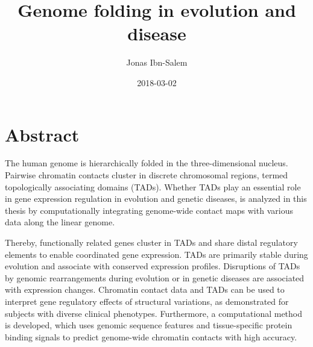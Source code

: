 \documentclass[a4paper,twoside=true,openright,parskip=full,chapterprefix=true,11pt,headings=normal,bibliography=totoc,listof=totoc,titlepage=on,captions=tableabove,draft=false]{scrreprt}
\title{Genome folding in evolution and disease}
\author{Jonas Ibn-Salem}
\date{2018-03-02}
\theoremstyle{definition}
\theoremstyle{definition}
\theoremstyle{definition}
\theoremstyle{remark}
\begin{document}




\pagestyle{empty}				%
\cleardoublepage

\pagestyle{plain}				%
\cleardoublepage
%
%

\setcounter{page}{1}			%
\pagestyle{maincontentstyle} 	%

{
\setcounter{tocdepth}{3}
\tableofcontents
}
\hypertarget{abstract}{%
\chapter*{Abstract}\label{abstract}}

The human genome is hierarchically folded in the three-dimensional
nucleus. Pairwise chromatin contacts cluster in discrete chromosomal
regions, termed topologically associating domains (TADs). Whether TADs
play an essential role in gene expression regulation in evolution and
genetic diseases, is analyzed in this thesis by computationally
integrating genome-wide contact maps with various data along the linear
genome.

Thereby, functionally related genes cluster in TADs and share distal
regulatory elements to enable coordinated gene expression. TADs are
primarily stable during evolution and associate with conserved
expression profiles. Disruptions of TADs by genomic rearrangements
during evolution or in genetic diseases are associated with expression
changes. Chromatin contact data and TADs can be used to interpret gene
regulatory effects of structural variations, as demonstrated for
subjects with diverse clinical phenotypes. Furthermore, a computational
method is developed, which uses genomic sequence features and
tissue-specific protein binding signals to predict genome-wide chromatin
contacts with high accuracy.
\end{document}
